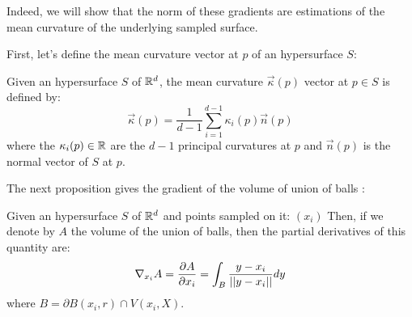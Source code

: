 Indeed, we will show that the norm of these gradients are estimations of the
mean curvature of the underlying sampled surface.

First, let's define the mean curvature vector at $ p $ of an hypersurface $ S $:
\begin{definition}
    Given an hypersurface $ S $ of $ \mathbb{R}^d $, the mean curvature $ \vec{\kappa}(p) $ vector at $ p
    \in S $ is defined by:
    $$ \vec{\kappa}(p) = \frac{1}{d-1} \sum_{i=1}^{d-1} \kappa_i(p) \vec{n}(p) $$
    where the $ \kappa_i(p) \in \mathbb{R} $ are the $ d - 1 $ principal curvatures at $ p $
    and $ \vec{n}(p) $ is the normal vector of $ S $ at $ p $.
\end{definition}

The next proposition gives the gradient of the volume of union of balls :
\begin{proposition}
    Given an hypersurface $ S $ of $ \mathbb{R}^d $ and points sampled on it: $ (x_i) $
    Then, if we denote by $ A $ the volume of the union of balls, then the
    partial derivatives of this quantity are:
    \begin{equation}
        \label{eqn:gradient_area_2d}
        \nabla_{x_i} A = \frac{\partial{A}}{\partial{x_i}} = \int_{B} \frac{y - x_i}{||y - x_i||} dy
    \end{equation}
    where $ B = \partial B(x_i, r) \cap V(x_i, X) $.
\end{proposition}

